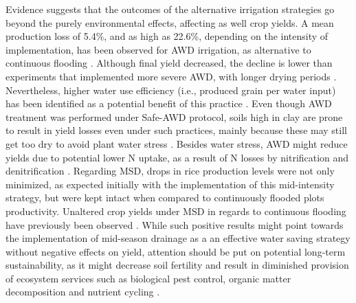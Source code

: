 Evidence suggests that the outcomes of the alternative irrigation strategies go beyond the purely environmental effects, affecting as well crop yields. A mean production loss of 5.4\%, and as high as 22.6\%, depending on the intensity of implementation, has been observed for AWD irrigation, as alternative to continuous flooding \citep{carrijo2017}.  Although final yield decreased, the decline is lower than experiments that implemented more severe AWD, with longer drying periods \citep{tabbal2002}. Nevertheless, higher water use efficiency (i.e., produced grain per water input) has been identified as a potential benefit of this practice \citep{wassmann2009regional}. Even though AWD treatment was performed under Safe-AWD protocol, soils high in clay are prone to result in yield losses even under such practices, mainly because these may still get too dry to avoid plant water stress \citep{carrijo2017}. Besides water stress, AWD might reduce yields due to potential lower N uptake, as a result of N losses by nitrification and denitrification \citep{pandey2014}. Regarding MSD, drops in rice production levels were not only minimized, as expected initially with the implementation of this mid-intensity strategy, but were kept intact when compared to continuously flooded plots productivity. Unaltered crop yields under MSD in regards to continuous flooding have previously been observed \citep{perry2022}. While such positive results might point towards the implementation of mid-season drainage as a an effective water saving strategy without negative effects on yield, attention should be put on potential long-term sustainability, as it might decrease soil fertility \citep{livsey2019} and result in diminished provision of ecosystem services such as biological pest control, organic matter decomposition and nutrient cycling \citep{nicholls1998, prather2013}.  \\

